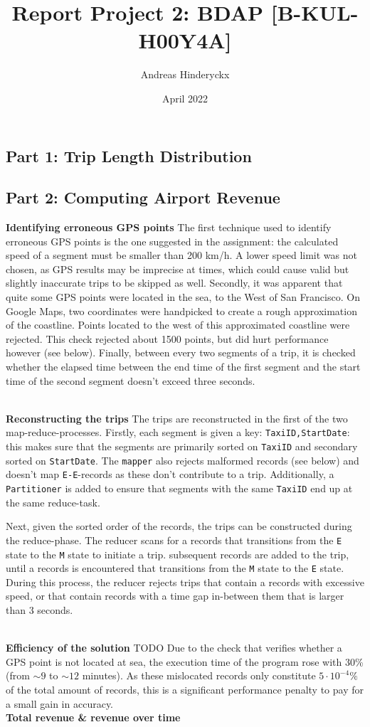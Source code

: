 \documentclass[12pt]{article}
\title{Report Project 2: BDAP [B-KUL-H00Y4A]}
\author{Andreas Hinderyckx}
\date{April 2022}
\begin{document}
\maketitle


\subsection*{Part 1: Trip Length Distribution}
\subsection*{Part 2: Computing Airport Revenue}

\textbf{Identifying erroneous GPS points}
The first technique used to identify erroneous GPS points is the one suggested in the assignment: the calculated speed of a segment must be smaller than 200 km/h. A lower speed limit was not chosen, as GPS results may be imprecise at times, which could cause valid but slightly inaccurate trips to be skipped as well. Secondly, it was apparent that quite some GPS points were located in the sea, to the West of San Francisco. On Google Maps, two coordinates were handpicked to create a rough approximation of the coastline. Points located to the west of this approximated coastline were rejected. This check rejected about 1500 points, but did hurt performance however (see below). Finally, between every two segments of a trip, it is checked whether the elapsed time between the end time of the first segment and the start time of the second segment doesn't exceed three seconds.

\noindent\\\textbf{Reconstructing the trips}
The trips are reconstructed in the first of the two map-reduce-processes. Firstly, each segment is given a key: \texttt{TaxiID,StartDate}: this makes sure that the segments are primarily sorted on \texttt{TaxiID} and secondary sorted on \texttt{StartDate}. The \texttt{mapper} also rejects malformed records (see below) and doesn't map \texttt{E-E}-records as these don't contribute to a trip. Additionally, a \texttt{Partitioner} is added to ensure that segments with the same \texttt{TaxiID} end up at the same reduce-task. 

Next, given the sorted order of the records, the trips can be constructed during the reduce-phase. The reducer scans for a records that transitions from the \texttt{E} state to the \texttt{M} state to initiate a trip. subsequent records are added to the trip, until a records is encountered that transitions from the \texttt{M} state to the \texttt{E} state. During this process, the reducer rejects trips that contain a records with excessive speed, or that contain records with a time gap in-between them that is larger than 3 seconds.

\noindent\\\textbf{Efficiency of the solution}
{\huge TODO} Due to the check that verifies whether a GPS point is not located at sea, the execution time of the program rose with 30\% (from $\sim9$ to $\sim12$ minutes). As these mislocated records only constitute $5\cdot 10^{-4}\%$ of the total amount of records, this is a significant performance penalty to pay for a small gain in accuracy.
\noindent\\\textbf{Total revenue \& revenue over time}
\end{document}
